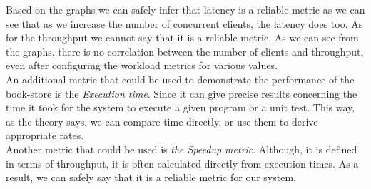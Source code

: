 \documentclass{article}      %
\begin{document}
Based on the graphs we can safely infer that latency is a reliable metric as we can see that as we increase the number of concurrent clients, the latency does too. As for the throughput we cannot say that it is a reliable metric. As we can see from the graphs, there is no correlation between the number of clients and throughput, even after configuring the workload metrics for various values. \\

An additional metric that could be used to demonstrate the performance of the book-store is the \emph{Execution time}. Since it can give precise results concerning the time it took for the system to execute a given program or a unit test. This way, as the theory says, we can compare time directly, or use them to derive appropriate rates. \\

Another metric that could be used is \emph{the Speedup metric}. Although, it is defined in terms of throughput, it is often calculated directly from execution times. As a result, we can safely say that it is a reliable metric for our system. \\
\end{document}
